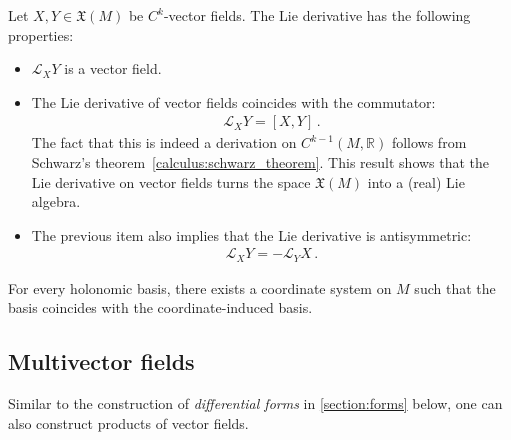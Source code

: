     \begin{property}\label{bundle:lie_bracket}
        Let $X,Y\in\mathfrak{X}(M)$ be $C^k$-vector fields. The Lie derivative has the following properties:
        \begin{itemize}
            \item $\mathcal{L}_XY$ is a vector field.
            \item The Lie derivative of vector fields coincides with the commutator:
                \begin{gather}
                    \mathcal{L}_XY = [X,Y]\,.
                \end{gather}
                The fact that this is indeed a derivation on $C^{k-1}(M,\mathbb{R})$ follows from Schwarz's theorem~\ref{calculus:schwarz_theorem}. This result shows that the Lie derivative on vector fields turns the space $\mathfrak{X}(M)$ into a (real) Lie algebra.
            \item The previous item also implies that the Lie derivative is antisymmetric:
                \begin{gather}
                    \label{bundle:lie_derivative_antisymmetry}
                    \mathcal{L}_XY = -\mathcal{L}_YX\,.
                \end{gather}
        \end{itemize}
    \end{property}

    \begin{property}
        For every holonomic basis, there exists a coordinate system on $M$ such that the basis coincides with the coordinate-induced basis.
    \end{property}

\subsection{Multivector fields}

    Similar to the construction of \textit{differential forms} in \cref{section:forms} below, one can also construct products of vector fields.

